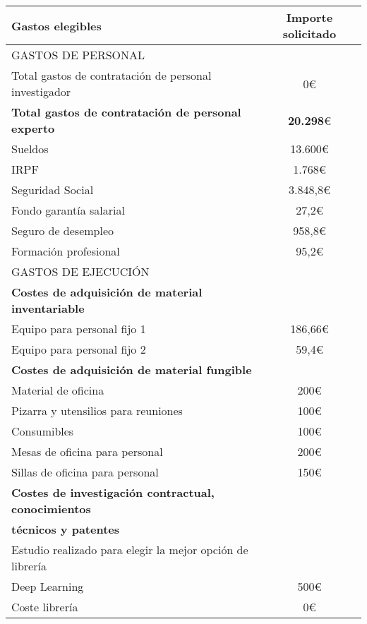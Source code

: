 \begin{table}[H]
		\begin{tabular}{|l|c|} \toprule
		\cellcolor{red} Gastos elegibles & Importe solicitado \\
		\hline \hline
		\cellcolor[gray]{0.5}GASTOS DE PERSONAL &  \\ \hline
		Total gastos de contratación de personal investigador & 0\euro \\ \hline
		\cellcolor[gray]{0.8} \textbf{Total gastos de contratación de personal experto} & \textbf{20.298}\euro \\ \hline
		Sueldos & 13.600\euro \\ \hline
		IRPF & 1.768\euro \\ \hline
		Seguridad Social & 3.848,8\euro \\ \hline
		Fondo garantía salarial & 27,2\euro \\ \hline
		Seguro de desempleo &  958,8\euro \\ \hline
		Formación profesional & 95,2\euro \\ \hline
		\cellcolor[gray]{0.5}GASTOS DE EJECUCIÓN &  \\ \hline
		\cellcolor[gray]{0.8}\textbf{Costes de adquisición de material inventariable} &  \\ \hline
		Equipo para personal fijo 1 & 186,66\euro  \\ \hline
		Equipo para personal fijo 2 & 59,4\euro \\ \hline
		\cellcolor[gray]{0.8}\textbf{Costes de adquisición de material fungible} &  \\ \hline
		Material de oficina & 200\euro \\ \hline
		Pizarra y utensilios para reuniones & 100\euro \\ \hline
		Consumibles & 100\euro \\ \hline
		Mesas de oficina para personal &  200\euro \\ \hline
		Sillas de oficina para personal &  150\euro \\ \hline
		\cellcolor[gray]{0.8}\textbf{Costes de investigación contractual, conocimientos } \\
		\cellcolor[gray]{0.8}\textbf{técnicos y patentes} & \\ \hline
		Estudio realizado para elegir la mejor opción de librería\\
		Deep Learning & 500\euro   \\ \hline
		Coste librería & 0\euro \\ \hline

\end{tabular}
\end{table}
